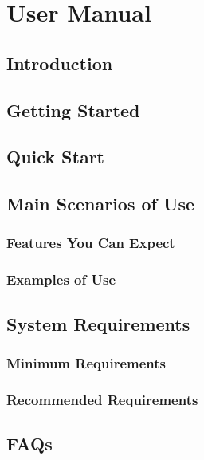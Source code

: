
\section{User Manual}

	\subsection{Introduction}
	
	\subsection{Getting Started}
	
	\subsection{Quick Start}
	
	\subsection{Main Scenarios of Use}
		
		\subsubsection{Features You Can Expect}
		
		\subsubsection{Examples of Use}
	
	\subsection{System Requirements}
		
		\subsubsection{Minimum Requirements}
		
		\subsubsection{Recommended Requirements}
	
	\subsection{FAQs}